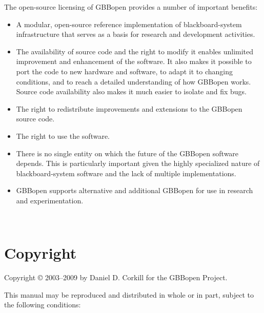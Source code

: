\documentclass[10pt,twoside,english,pdftex]{article}
\begin{document}
{The open-source licensing of GBBopen provides a number of important benefits:
\begin{itemize}
\item A modular, open-source reference implementation of
  blackboard-system infrastructure that serves as a basis for research
  and development activities.
\item The availability of source code and the right to modify it
  enables unlimited improvement and enhancement of the software. It
  also makes it possible to port the code to new hardware and
  software, to adapt it to changing conditions, and to reach a
  detailed understanding of how GBBopen works. Source code
  availability also makes it much easier to isolate and fix bugs.
\item The right to redistribute improvements and extensions to the
  GBBopen source code.
\item The right to use the software.
\item There is no single entity on which the future of the GBBopen
  software depends. This is particularly important given the highly
  specialized nature of blackboard-system software and the lack of
  multiple implementations.
\item GBBopen supports alternative and additional GBBopen  for
  use in research and experimentation.
\end{itemize}
}%


\T\begin{ifhtml} 
  \intro
  \setcounter{htmlautomenu}{0}
\T\end{ifhtml}

\T\thispagestyle{empty}


\T\newpage
\T~
\T\vfill
\W{}
\W\section*{Copyright}

Copyright \copyright{} 2003--2009 by Daniel D. Corkill for the
GBBopen Project.

This manual may be reproduced and distributed in whole or in
part, subject to the following conditions: 
\end{document}
